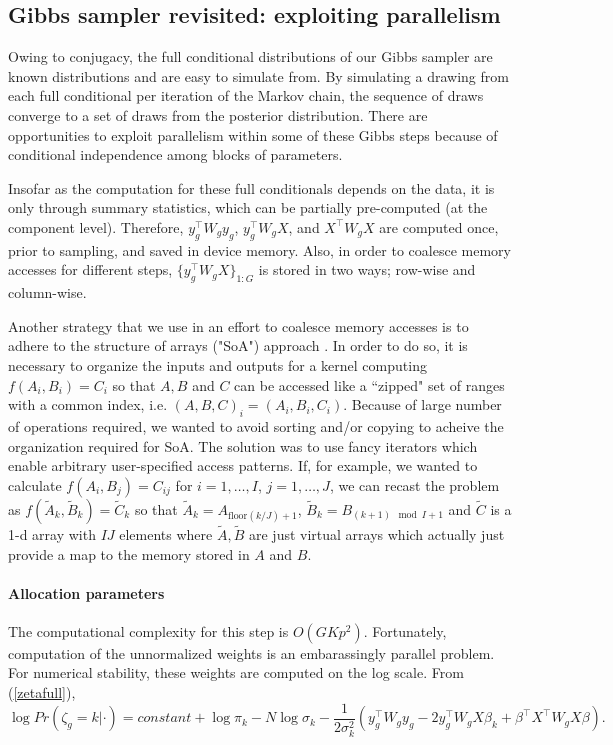 {\subsection{Gibbs sampler revisited: exploiting parallelism}
\label{subsec:gibbs-revisited}
Owing to conjugacy, the full conditional distributions of our Gibbs sampler are known distributions and are easy to simulate from. By simulating a drawing from each full conditional per iteration of the Markov chain, the sequence of draws converge to a set of draws from the posterior distribution. There are opportunities to exploit parallelism within some of these Gibbs steps because of conditional independence among blocks of parameters. 

Insofar as the computation for these full conditionals depends on the data, it is only through summary statistics, which can be partially pre-computed (at the component level). Therefore, $y_g^\top W_g y_g$, $y_g^\top W_g X$, and $X^\top W_g X$ are computed once, prior to sampling, and saved in device memory. Also, in order to coalesce memory accesses for different steps, $\{y_g^\top W_g X\}_{1:G}$ is stored in two ways; row-wise and column-wise.

Another strategy that we use in an effort to coalesce memory accesses is to adhere to the structure of arrays ("SoA") approach \citep{thrustslides}. In order to do so, it is necessary to organize the inputs and outputs for a kernel computing $f(A_i,B_i)=C_i$ so that $A, B$ and $C$ can be accessed like a ``zipped" set of ranges with a common index, i.e. $(A,B,C)_i = (A_i,B_i,C_i)$. Because of large number of operations required, we wanted to avoid sorting and/or copying to acheive the organization required for SoA. The solution was to use fancy iterators which enable arbitrary user-specified access patterns. If, for example, we wanted to calculate $f(A_i,B_j)=C_{ij}$ for $i=1,\ldots,I$, $j=1,\ldots,J$, we can recast the problem as $f(\tilde{A}_k,\tilde{B}_k)=\tilde{C}_k$ so that $\tilde{A}_k=A_{\mbox{floor}(k/J)+1}$, $\tilde{B}_k=B_{(k+1) \mod I +1}$ and $\tilde{C}$ is a 1-d array with $IJ$ elements where $\tilde{A},\tilde{B}$ are just virtual arrays which actually just provide a map to the memory stored in $A$ and $B$. 

\paragraph{Allocation parameters}
The computational complexity for this step is $O(GKp^2)$. Fortunately, computation of the unnormalized weights is an embarassingly parallel problem. For numerical stability, these weights are computed on the log scale. From (\ref{zetafull}),
\begin{equation}
\label{logweight}
\log Pr(\zeta_g=k|\cdot) = constant + \log \pi_k -N \log \sigma_k - \frac{1}{2\sigma^2_k}\left(y_g^\top W_g y_g - 2y_g^\top W_g X \beta_k + \beta^\top X^\top W_g X \beta \right).
\end{equation}

}
